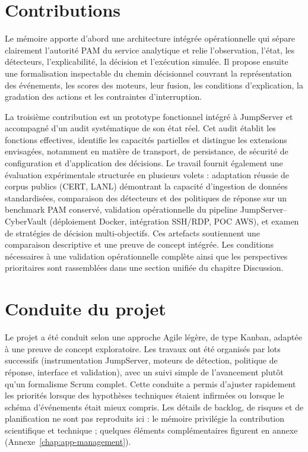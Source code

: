 \documentclass[11pt,a4paper,oneside]{report}
\theoremstyle{definition}
\theoremstyle{plain}
\begin{document}
\section{Contributions}
\label{sec:intro-contributions}

Le mémoire apporte d'abord une architecture intégrée opérationnelle qui sépare clairement
l'autorité PAM du service analytique et relie l'observation, l'état, les
détecteurs, l'explicabilité, la décision et l'exécution simulée. Il propose
ensuite une formalisation inspectable du chemin décisionnel couvrant la représentation
des événements, les scores des moteurs, leur fusion, les conditions d'explication,
la gradation des actions et les contraintes d'interruption.

La troisième contribution est un prototype fonctionnel intégré à JumpServer et
accompagné d'un audit systématique de son état réel. Cet audit établit les fonctions
effectives, identifie les capacités partielles et distingue les extensions envisagées,
notamment en matière de transport, de persistance, de sécurité de
configuration et d'application des décisions. Le travail fournit également une
évaluation expérimentale structurée en plusieurs volets : adaptation réussie de corpus publics
(CERT, LANL) démontrant la capacité d'ingestion de données standardisées, comparaison des détecteurs et des politiques de réponse sur un
benchmark PAM conservé, validation opérationnelle du pipeline
JumpServer--CyberVault (déploiement Docker, intégration SSH/RDP, POC AWS), et examen de stratégies de décision multi-objectifs.
Ces artefacts soutiennent une comparaison descriptive et une preuve de concept
intégrée. Les conditions nécessaires à une validation opérationnelle complète ainsi que les perspectives prioritaires sont rassemblées dans une section unifiée du chapitre Discussion.

\section{Conduite du projet}
\label{sec:intro-pilotage}

Le projet a été conduit selon une approche Agile légère, de type Kanban,
adaptée à une preuve de concept exploratoire. Les travaux ont été organisés
par lots successifs (instrumentation JumpServer, moteurs de détection,
politique de réponse, interface et validation), avec un suivi simple de
l'avancement plutôt qu'un formalisme Scrum complet. Cette conduite a permis
d'ajuster rapidement les priorités lorsque des hypothèses techniques étaient
infirmées ou lorsque le schéma d'événements était mieux compris. Les détails
de backlog, de risques et de planification ne sont pas reproduits ici : le
mémoire privilégie la contribution scientifique et technique ; quelques
éléments complémentaires figurent en annexe
(Annexe~\ref{chap:app-management}).
\end{document}
